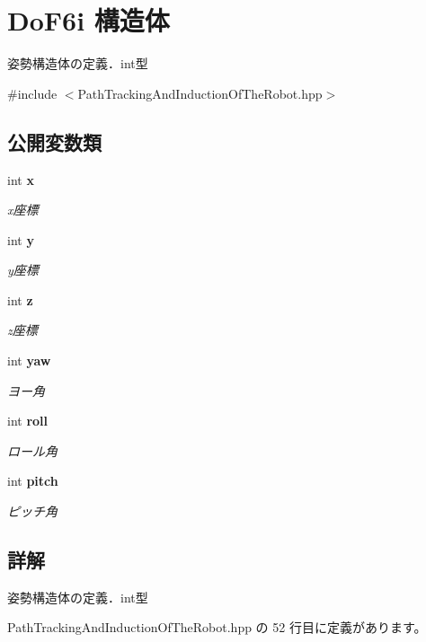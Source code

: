 \section{Do\-F6i 構造体}
\label{struct_do_f6i}


姿勢構造体の定義．int型  




{\ttfamily \#include $<$Path\-Tracking\-And\-Induction\-Of\-The\-Robot.\-hpp$>$}

\subsection*{公開変数類}
\begin{DoxyCompactItemize}
\item 
int {\bf x}
\begin{DoxyCompactList}\small\item\em x座標 \end{DoxyCompactList}\item 
int {\bf y}
\begin{DoxyCompactList}\small\item\em y座標 \end{DoxyCompactList}\item 
int {\bf z}
\begin{DoxyCompactList}\small\item\em z座標 \end{DoxyCompactList}\item 
int {\bf yaw}
\begin{DoxyCompactList}\small\item\em ヨー角 \end{DoxyCompactList}\item 
int {\bf roll}
\begin{DoxyCompactList}\small\item\em ロール角 \end{DoxyCompactList}\item 
int {\bf pitch}
\begin{DoxyCompactList}\small\item\em ピッチ角 \end{DoxyCompactList}\end{DoxyCompactItemize}


\subsection{詳解}
姿勢構造体の定義．int型 

 Path\-Tracking\-And\-Induction\-Of\-The\-Robot.\-hpp の 52 行目に定義があります。



